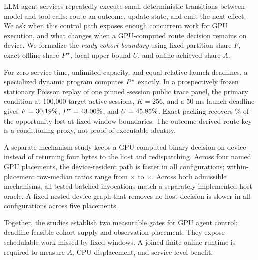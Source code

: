 LLM-agent services repeatedly execute small deterministic
transitions between model and tool calls: route an outcome, update state, and
emit the next effect. We ask when this control path exposes enough concurrent
work for GPU execution, and what changes when a GPU-computed route decision
remains on device. We formalize the \emph{ready-cohort boundary} using
fixed-partition share $F$, exact offline share $P^\star$, local upper bound $U$,
and online achieved share $A$.

For zero service time,
unlimited capacity, and equal relative launch deadlines, a specialized dynamic
program computes $P^\star$ exactly. In a
prospectively frozen stationary Poisson replay of one pinned
\TraceSessions-session public trace panel, the primary condition at 100{,}000
target active sessions, $K=256$, and a 50 ms launch deadline gives
$F=30.19\%$, $P^\star=43.00\%$, and $U=45.85\%$.
Exact packing recovers \TraceGapClosurePct\% of the opportunity lost at fixed
window boundaries. The outcome-derived route key is a
conditioning proxy, not proof of executable identity.

A separate mechanism study keeps a
GPU-computed binary decision on device instead of returning four bytes to the
host and redispatching. Across four named GPU placements, the device-resident
path is faster in all \ResidentCells{} configurations; within-placement
row-median ratios range from \ResidentRatioMin$\times$ to
\ResidentRatioMax$\times$. Across both admissible mechanisms,
all \ResidentLegalInvocations{} tested batched invocations match a separately
implemented host oracle. A fixed nested device graph that
removes no host decision is slower in all \NativeCells{} configurations across
five placements.

Together, the studies establish two measurable gates for GPU agent control:
deadline-feasible cohort supply and observation placement. They expose
schedulable work missed by fixed windows. A joined finite online runtime is
required to measure $A$, CPU displacement, and service-level benefit.
